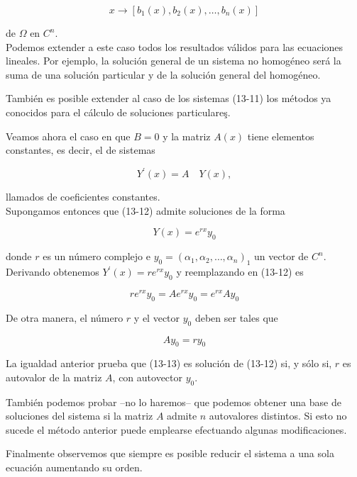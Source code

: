 \documentclass[10pt]{article}
\theoremstyle{plain}
\theoremstyle{definition}
\theoremstyle{remark}
\begin{document}
$$
x \rightarrow\left[b_{1}(x), b_{2}(x), \ldots, b_{n}(x)\right]
$$

de $\Omega$ en $C^{n}$.\\
Podemos extender a este caso todos los resultados válidos para las ecuaciones lineales. Por ejemplo, la solución general de un sistema no homogéneo será la suma de una solución particular y de la solución general del homogéneo.

También es posible extender al caso de los sistemas (13-11) los métodos ya conocidos para el cálculo de soluciones particulareş.

Veamos ahora el caso en que $B=0$ y la matriz $A(x)$ tiene elementos constantes, es decir, el de sistemas


\begin{equation*}
Y^{\prime}(x)=A \quad Y(x), \tag{13-12}
\end{equation*}


llamados de coeficientes constantes.\\
Supongamos entonces que (13-12) admite soluciones de la forma


\begin{equation*}
Y(x)=e^{r x} y_{0} \tag{13-13}
\end{equation*}


donde $r$ es un número complejo e $y_{0}=\left(\alpha_{1}, \alpha_{2}, \ldots, \alpha_{n}\right)_{1}$ un vector de $C^{n}$.\\
Derivando obtenemos $Y^{\prime}(x)=r e^{r x} y_{0}$ y reemplazando en (13-12) es

$$
r e^{r x} y_{0}=A e^{r x} y_{0}=e^{r x} A y_{0}
$$

De otra manera, el número $r$ y el vector $y_{0}$ deben ser tales que


\begin{equation*}
A y_{0}=r y_{0} \tag{13-14}
\end{equation*}


La igualdad anterior prueba que (13-13) es solución de (13-12) si, y sólo si, $r$ es autovalor de la matriz $A$, con autovector $y_{0}$.

También podemos probar --no lo haremos-- que podemos obtener una base de soluciones del sistema si la matriz $A$ admite $n$ autovalores distintos. Si esto no sucede el método anterior puede emplearse efectuando algunas modificaciones.

Finalmente observemos que siempre es posible reducir el sistema a una sola ecuación aumentando su orden.
\end{document}

